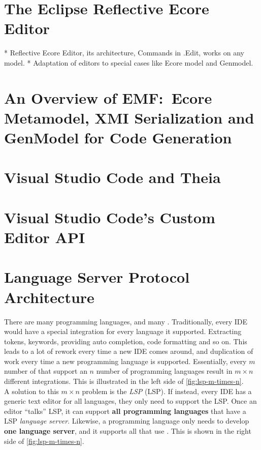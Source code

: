 \section{The Eclipse Reflective Ecore Editor}

* Reflective Ecore Editor, its architecture, Commands in .Edit, works on any model.
* Adaptation of editors to special cases like Ecore model and Genmodel.

\section{An Overview of EMF:\ Ecore Metamodel, XMI Serialization and GenModel for Code Generation}\label{sec:emf-metamodel}



\section{Visual Studio Code and Theia}




\section{Visual Studio Code's Custom Editor API}\label{sec:vscode-custom-editor}




\section{Language Server Protocol Architecture}\label{sec:lsp}

There are many programming languages, and many .
Traditionally, every \acrshort{IDE} would have a special integration for every language it supported.
Extracting tokens, keywords, providing auto completion, code formatting and so on.
This leads to a lot of rework every time a new \acrshort{IDE} comes around, and duplication of work every time a new programming language is supported.
Essentially, every $m$ number of  that support an $n$ number of programming languages result in $m\times{}n$ different integrations.
This is illustrated in the left side of \cref{fig:lsp-m-times-n}.\\

A solution to this $m\times{}n$ problem is the \textit{\acrlong{LSP}} (\acrshort{LSP}).
If instead, every \acrshort{IDE} has a generic text editor for all languages, they only need to support the \acrshort{LSP}.
Once an editor ``talks'' \acrshort{LSP}, it can support \textbf{all programming languages} that have a \acrshort{LSP} \textit{language server}.
Likewise, a programming language only needs to develop \textbf{one language server}, and it supports all  that use .
This is shown in the right side of \cref{fig:lsp-m-times-n}.


